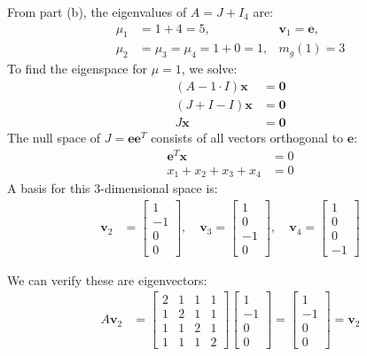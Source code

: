 From part (b), the eigenvalues of $A = J + I_4$ are:
\begin{align*}
    \mu_1 & = 1 + 4 = 5,                 & \mathbf{\mathbf{v}}_1 = \mathbf{e}, \\
    \mu_2 & = \mu_3 = \mu_4 = 1 + 0 = 1, & m_g(1) = 3
\end{align*}
To find the eigenspace for $\mu = 1$, we solve:
\begin{align*}
    \left(A- 1\cdot I\right)\mathbf{x} & = \mathbf{0} \\
    \left(J + I - I\right)\mathbf{x}   & = \mathbf{0} \\
    J\mathbf{x}                        & = \mathbf{0}
\end{align*}
The null space of $J = \mathbf{e}\mathbf{e}^T$ consists of all vectors orthogonal to $\mathbf{e}$:
\begin{align*}
    \mathbf{e}^T\mathbf{x} & = 0 \\
    x_1 + x_2 + x_3 + x_4  & = 0
\end{align*}
A basis for this 3-dimensional space is:
\begin{align*}
    \mathbf{\mathbf{v}}_2 & = \begin{bmatrix} 1 \\ -1 \\ 0 \\ 0 \end{bmatrix}, \quad
    \mathbf{\mathbf{v}}_3 = \begin{bmatrix} 1 \\ 0 \\ -1 \\ 0 \end{bmatrix}, \quad
    \mathbf{\mathbf{v}}_4 = \begin{bmatrix} 1 \\ 0 \\ 0 \\ -1 \end{bmatrix}
\end{align*}

We can verify these are eigenvectors:
\begin{align*}
    A\mathbf{\mathbf{v}}_2 & =
    \begin{bmatrix}
        2 & 1 & 1 & 1 \\
        1 & 2 & 1 & 1 \\
        1 & 1 & 2 & 1 \\
        1 & 1 & 1 & 2
    \end{bmatrix}
    \begin{bmatrix}
        1  \\
        -1 \\
        0  \\
        0
    \end{bmatrix} =
    \begin{bmatrix}
        1  \\
        -1 \\
        0  \\
        0
    \end{bmatrix}
    = \mathbf{\mathbf{v}}_2
\end{align*}

